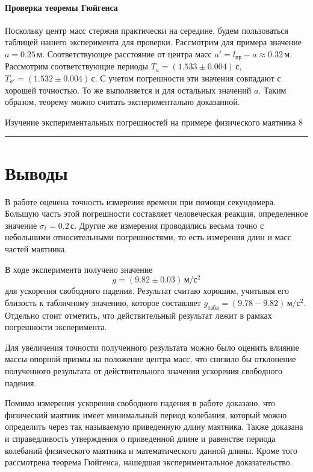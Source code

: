 \documentclass[12pt,a4paper]{scrartcl}
\begin{document}
	\paragraph{Проверка теоремы Гюйгенса} \hfill
	
	Поскольку центр масс стержня практически на середине, будем пользоваться таблицей нашего эксперимента для проверки. Рассмотрим для примера значение $a = 0.25\,$м. Соответствующее расстояние от центра масс $a' = l_{\text{пр}} - a \approx 0.32\,$м.
	Рассмотрим соответствующие периоды $T_a = (1.533 \pm 0.004)\,$с, $T_{a'} = (1.532 \pm 0.004)\,$с. С учетом погрешности эти значения совпадают с хорошей точностью. То же выполняется и для остальных значений $a$. Таким образом, теорему можно считать экспериментально доказанной.
	
	\newpage
	
	
	
	
	\begin{flushleft}
		
		\footnotesize{Изучение экспериментальных погрешностей на примере физического маятника} \hspace{\fill} \footnotesize{8}
		\\[-0.3cm]\noindent\rule{\textwidth}{0.3pt}
		
	\end{flushleft}
	
	\section{Выводы}
	В работе оценена точность измерения времени при помощи секундомера. Большую часть этой погрешности составляет человеческая реакция, определенное значение $\sigma_t = 0.2\,\text{с}$. Другие же измерения проводились весьма точно с небольшими относительными погрешностями, то есть измерения длин и масс частей маятника.

	В ходе эксперимента получено значение
	$$g = (9.82 \pm 0.03)\,\text{м}/\text{с}^2$$
	для ускорения свободного падения. Результат считаю хорошим, учитывая его близость к табличному значению, которое составляет $g_{\text{табл}} = (9.78 - 9.82)\,\text{м}/\text{с}^2$. Отдельно стоит отметить, что действительный результат лежит в рамках погрешности эксперимента.
	
	Для увеличения точности полученного результата можно было оценить влияние массы опорной призмы на положение центра масс, что снизило бы отклонение полученного результата от действительного значения ускорения свободного падения.
	
	Помимо измерения ускорения свободного падения в работе доказано, что физический маятник имеет минимальный период колебания, который можно определить через так называемую приведенную длину маятника. Также доказана и справедливость утверждения о приведенной длине и равенстве периода колебаний физического маятника и математического данной длины. Кроме того рассмотрена теорема Гюйгенса, нашедшая экспериментальное доказательство.
\end{document}
